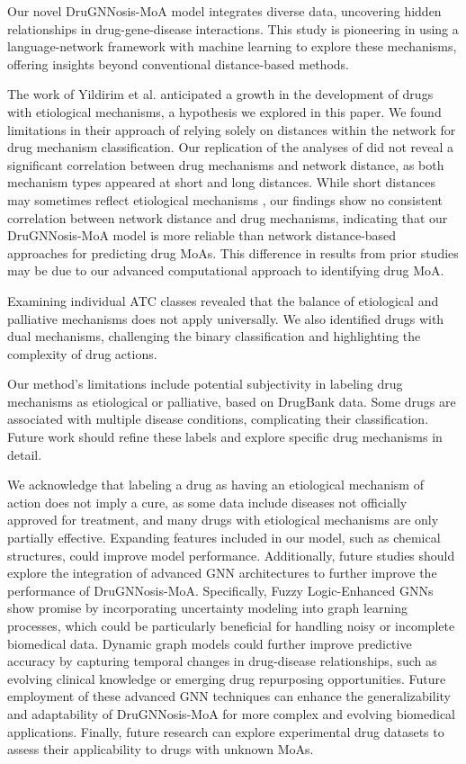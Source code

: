 \documentclass[journal,twoside,web]{ieeecolor}
\begin{document}
Our novel DruGNNosis-MoA model integrates diverse data, uncovering hidden relationships in drug-gene-disease interactions. 
This study is pioneering in using a language-network framework with machine learning to explore these mechanisms, offering insights beyond conventional distance-based methods.

The work of Yildirim et al. \cite{yildirim2007drug} anticipated a growth in the development of drugs with etiological mechanisms, a hypothesis we explored in this paper.
We found limitations in their approach \cite{yildirim2007drug} of relying solely on distances within the network for drug mechanism classification.
Our replication of the analyses of \cite{yildirim2007drug} did not reveal a significant correlation between drug mechanisms and network distance, as both mechanism types appeared at short and long distances. 
While short distances may sometimes reflect etiological mechanisms \cite{yildirim2007drug}, our findings show no consistent correlation between network distance and drug mechanisms, indicating that our DruGNNosis-MoA model is more reliable than network distance-based approaches for predicting drug MoAs.
This difference in results from prior studies may be due to our advanced computational approach to identifying drug MoA.

Examining individual ATC classes revealed that the balance of etiological and palliative mechanisms does not apply universally.
We also identified drugs with dual mechanisms, challenging the binary classification and highlighting the complexity of drug actions.

Our method's limitations include potential subjectivity in labeling drug mechanisms as etiological or palliative, based on DrugBank data.
Some drugs are associated with multiple disease conditions, complicating their classification. 
Future work should refine these labels and explore specific drug mechanisms in detail.

We acknowledge that labeling a drug as having an etiological mechanism of action does not imply a cure, as some data include diseases not officially approved for treatment, and many drugs with etiological mechanisms are only partially effective. 
Expanding features included in our model, such as chemical structures, could improve model performance.
Additionally, future studies should explore the integration of advanced GNN architectures to further improve the performance of DruGNNosis-MoA. 
Specifically, Fuzzy Logic-Enhanced GNNs \cite{yang2023fuzzy} show promise by incorporating uncertainty modeling into graph learning processes, which could be particularly beneficial for handling noisy or incomplete biomedical data.
Dynamic graph models could further improve predictive accuracy by capturing temporal changes in drug-disease relationships, such as evolving clinical knowledge or emerging drug repurposing opportunities.
Future employment of these advanced GNN techniques can enhance the generalizability and adaptability of DruGNNosis-MoA for more complex and evolving biomedical applications.
Finally, future research can explore experimental drug datasets to assess their applicability to drugs with unknown MoAs.
\end{document}
